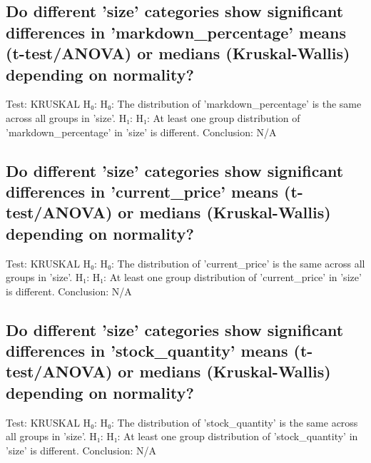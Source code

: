 \documentclass{article}%
\begin{document}
%
\subsection{Do different 'size' categories show significant differences in 'markdown\_percentage' means (t{-}test/ANOVA) or medians (Kruskal{-}Wallis) depending on normality?}%
\label{subsec:Dodifferentsizecategoriesshowsignificantdifferencesinmarkdownpercentagemeans(t{-}test/ANOVA)ormedians(Kruskal{-}Wallis)dependingonnormality?}%
Test: KRUSKAL\newline%
H₀: H₀: The distribution of 'markdown\_percentage' is the same across all groups in 'size'.\newline%
H₁: H₁: At least one group distribution of 'markdown\_percentage' in 'size' is different.\newline%
Conclusion: N/A

%
\subsection{Do different 'size' categories show significant differences in 'current\_price' means (t{-}test/ANOVA) or medians (Kruskal{-}Wallis) depending on normality?}%
\label{subsec:Dodifferentsizecategoriesshowsignificantdifferencesincurrentpricemeans(t{-}test/ANOVA)ormedians(Kruskal{-}Wallis)dependingonnormality?}%
Test: KRUSKAL\newline%
H₀: H₀: The distribution of 'current\_price' is the same across all groups in 'size'.\newline%
H₁: H₁: At least one group distribution of 'current\_price' in 'size' is different.\newline%
Conclusion: N/A

%
\subsection{Do different 'size' categories show significant differences in 'stock\_quantity' means (t{-}test/ANOVA) or medians (Kruskal{-}Wallis) depending on normality?}%
\label{subsec:Dodifferentsizecategoriesshowsignificantdifferencesinstockquantitymeans(t{-}test/ANOVA)ormedians(Kruskal{-}Wallis)dependingonnormality?}%
Test: KRUSKAL\newline%
H₀: H₀: The distribution of 'stock\_quantity' is the same across all groups in 'size'.\newline%
H₁: H₁: At least one group distribution of 'stock\_quantity' in 'size' is different.\newline%
Conclusion: N/A
\end{document}
